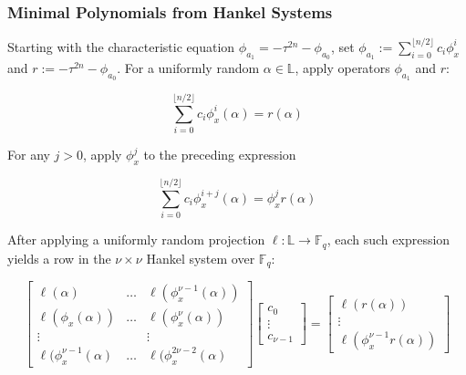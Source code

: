 \documentclass[sigconf]{acmart}
\newcommand{\F}{\mathbb{F}}
\renewcommand{\L}{\mathbb{L}}
\begin{document}
\subsubsection{Minimal Polynomials from Hankel Systems} Starting with the characteristic equation $\phi_{a_1} = -\tau^{2n} - \phi_{a_0}$, set $\phi_{a_1} := \sum_{i=0}^{\lfloor n/2 \rfloor} c_i\phi_{x}^i$ and $r := -\tau^{2n} - \phi_{a_0}$. For a uniformly random $\alpha \in \L$, apply operators $\phi_{a_1}$ and $r$:

\begin{equation*}
    \sum_{i=0}^{\lfloor n/2 \rfloor} c_i\phi_{x}^i(\alpha) = r(\alpha)
\end{equation*}

For any $j > 0$, apply $\phi_x^j$ to the preceding expression

\begin{equation*}
    \sum_{i=0}^{\lfloor n/2 \rfloor} c_i\phi_{x}^{i +j}(\alpha) = \phi_x^jr(\alpha)
\end{equation*}

After applying a uniformly random projection $\ell : \L \to \F_q$, each such expression yields a row in the $\nu \times \nu$ Hankel system over $\F_q$:

\begin{equation*}
    \begin{bmatrix}
    \ell(\alpha) & \ldots & \ell(\phi_x^{\nu - 1}(\alpha)) \\
    \ell(\phi_x(\alpha)) & \ldots & \ell(\phi_x^{\nu}(\alpha)) \\
    \vdots & & \vdots \\
    \ell(\phi_x^{\nu - 1}(\alpha) & \ldots & \ell(\phi_x^{2\nu - 2}(\alpha)
    \end{bmatrix}
    \begin{bmatrix}c_0 \\ \vdots \\ c_{\nu - 1} \end{bmatrix} = 
    \begin{bmatrix} \ell (r(\alpha)) \\ \vdots \\ \ell(\phi_x^{\nu - 1}r(\alpha)) \end{bmatrix}
\end{equation*}
\end{document}
